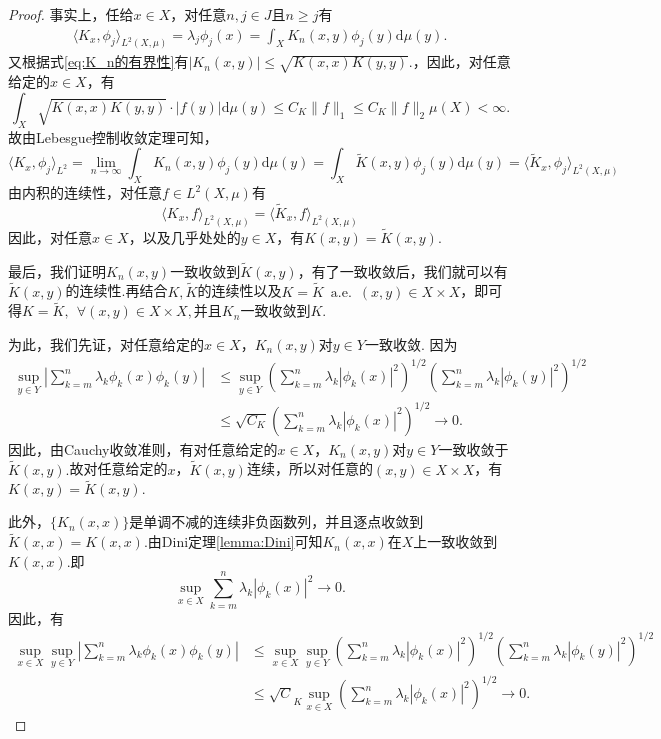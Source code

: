\documentclass[../master.tex]{subfiles}
\begin{document}
\begin{proof}
事实上，任给$x\in X$，对任意$n,j\in J$且$n\geq j$有
\begin{align*}
    \langle K_x,\phi_j\rangle_{L^2(X,\mu) } = \lambda_j \phi_j(x) = \int_{X}K_n(x,y)\phi_j(y)\mathrm{d}\mu (y).
\end{align*}
又根据式\eqref{eq:K_n的有界性}有$|K_n(x,y)|\leq \sqrt{K(x,x)K(y,y)}.$，因此，对任意给定的$x\in X$，有
\begin{equation*}
    \int_{X} \sqrt{K(x,x)K(y,y)}\cdot |f(y)|\mathrm{d}\mu(y)\leq C_K \|f\|_1\leq C_K\|f\|_2 \mu(X)<\infty.
\end{equation*}
故由Lebesgue控制收敛定理可知，
\begin{equation*}
    \langle K_x,\phi_j\rangle_{L^2} = \lim_{n\to\infty}\int_{X}K_n(x,y)\phi_j(y)\mathrm{d}\mu (y) = \int_{X}\widetilde{K}(x,y)\phi_j(y)\mathrm{d}\mu(y) = \langle \widetilde{K}_x,\phi_j\rangle_{L^2(X,\mu)}
\end{equation*}
由内积的连续性，对任意$f\in L^2(X,\mu)$有
\begin{equation*}
    \langle K_x,f\rangle_{L^2(X,\mu)}=\langle \widetilde{K}_x,f\rangle_{L^2(X,\mu)}
\end{equation*}
因此，对任意$x\in X$，以及几乎处处的$y\in X$，有$K(x,y)= \widetilde{K}(x,y).$


最后，我们证明$K_n(x,y)$一致收敛到$\widetilde{K}(x,y)$，有了一致收敛后，我们就可以有$\widetilde{K}(x,y)$的连续性.再结合$K,\widetilde{K}$的连续性以及$K = \widetilde{K}~\operatorname{a.e.} ~(x,y)\in X\times X$，即可得$K=\widetilde{K},~~\forall (x,y)\in X\times X,$并且$K_n$一致收敛到$K.$

为此，我们先证，对任意给定的$x\in X$，$K_n(x,y)$对$y\in Y$一致收敛.
因为
\begin{align*}
    \sup_{y\in Y} |\sum_{k=m}^n \lambda_k\phi_k(x)\phi_k(y)|&\leq \sup_{y\in Y}\left( \sum_{k=m}^n\lambda_k|\phi_k(x)|^2\right)^{1/2}\left( \sum_{k=m}^n\lambda_k|\phi_k(y)|^2\right)^{1/2}\\
    &\leq \sqrt{C_K} \left( \sum_{k=m}^n\lambda_k|\phi_k(x)|^2\right)^{1/2}\to 0.
\end{align*}
因此，由Cauchy收敛准则，有对任意给定的$x\in X$，$K_n(x,y)$对$y\in Y$一致收敛于$\widetilde{K}(x,y).$故对任意给定的$x$，$\widetilde{K}(x,y)$连续，所以对任意的$(x,y)\in X\times X$，有$K(x,y)=\widetilde{K}(x,y).$

此外，$\{K_n(x,x)\}$是单调不减的连续非负函数列，并且逐点收敛到$\widetilde{K}(x,x)=K(x,x)$.由Dini定理\ref{lemma:Dini}可知$K_n(x,x)$在$X$上一致收敛到$K(x,x).$即
\begin{equation*}
    \sup_{x\in X}\sum_{k=m}^n \lambda_k|\phi_k(x)|^2\to 0.
\end{equation*}
因此，有
\begin{align*}
    \sup_{x\in X}\sup_{y\in Y} |\sum_{k=m}^n \lambda_k\phi_k(x)\phi_k(y)|&\leq \sup_{x\in X}\sup_{y\in Y}\left( \sum_{k=m}^n\lambda_k|\phi_k(x)|^2\right)^{1/2}\left( \sum_{k=m}^n\lambda_k|\phi_k(y)|^2\right)^{1/2}\\
    &\leq \sqrt C_K \sup_{x\in X}\left( \sum_{k=m}^n\lambda_k|\phi_k(x)|^2\right)^{1/2}\to 0.
\end{align*}
\end{proof}
\end{document}
